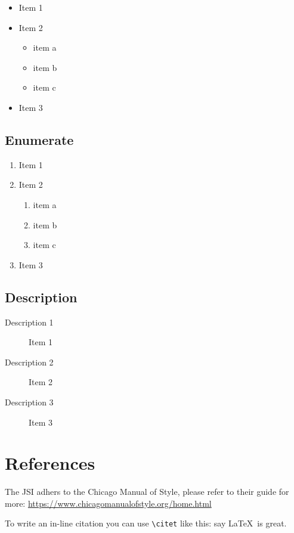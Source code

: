 \documentclass{EQDclass}
\begin{document}
\begin{itemize}
    \item Item 1
    \item Item 2
        \begin{itemize}
            \item item a
            \item item b
            \item item c
        \end{itemize}
    \item Item 3
\end{itemize}


\subsection{Enumerate}

\begin{enumerate}
    \item Item 1
    \item Item 2
        \begin{enumerate}
            \item item a
            \item item b
            \item item c
        \end{enumerate}
    \item Item 3
\end{enumerate}


\subsection{Description}

\begin{description}
    \item[Description 1] Item 1
    \item[Description 2] Item 2
    \item[Description 3] Item 3
\end{description}

\section{References}

The JSI adhers to the Chicago Manual of Style, please refer to their guide for more: \url{https://www.chicagomanualofstyle.org/home.html}

To write an in-line citation you can use \verb+\citet+ like this: \citet{latexcompanion} say \LaTeX\ is great.
\end{document}
